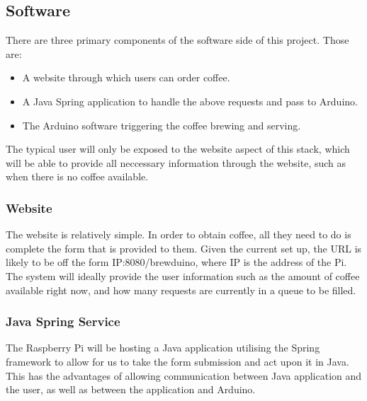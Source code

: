 \documentclass[12pt, a4paper]{article}
\begin{document}
\subsection{Software}
There are three primary components of the software side of this project. Those
are:
\begin{itemize}
	\item A website through which users can order coffee.
	\item A Java Spring application to handle the above requests and pass to
	Arduino.
	\item The Arduino software triggering the coffee brewing and serving.
\end{itemize}
The typical user will only be exposed to the website aspect of this stack, which
will be able to provide all neccessary information through the website, such as
when there is no coffee available.

\subsubsection{Website}
The website is relatively simple. In order to obtain coffee, all they need to
do is complete the form that is provided to them. Given the current set up, the
URL is likely to be off the form IP:8080/brewduino, where IP is the address of
the Pi. The system will ideally provide the user information such as the amount
of coffee available right now, and how many requests are currently in a queue to
be filled.

\subsubsection{Java Spring Service}
The Raspberry Pi will be hosting a Java application utilising the Spring
framework to allow for us to take the form submission and act upon it in Java.
This has the advantages of allowing communication between Java application and
the user, as well as between the application and Arduino.
\end{document}
